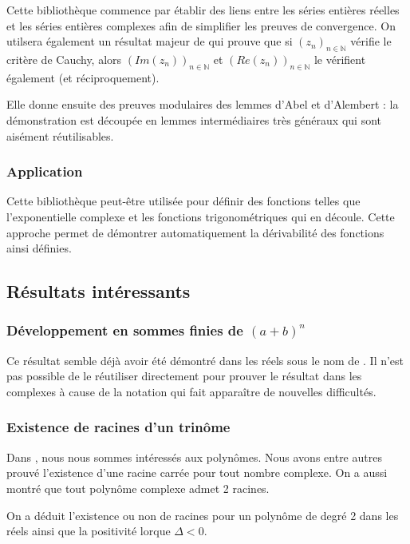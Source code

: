 Cette bibliothèque commence par établir des liens entre les séries entières réelles et les séries entières complexes afin de simplifier les preuves de convergence. On utilsera également un résultat majeur de  qui prouve que si $(z_n)_{n \in \mathbb{N}}$ vérifie le critère de Cauchy, alors $(Im (z_n))_{n \in \mathbb{N}}$ et $(Re(z_n))_{n \in \mathbb{N}}$ le vérifient également (et réciproquement).

Elle donne ensuite des preuves modulaires des lemmes d'Abel et d'Alembert : la démonstration est découpée en lemmes intermédiaires très généraux qui sont aisément réutilisables.

\subsubsection{Application}

Cette bibliothèque peut-être utilisée pour définir des fonctions telles que l'exponentielle complexe et les fonctions trigonométriques qui en découle. Cette approche permet de démontrer automatiquement la dérivabilité des fonctions ainsi définies.

\subsection{Résultats intéressants}

\subsubsection{D\'eveloppement en sommes finies de $(a + b) ^ n$}

Ce résultat semble déjà avoir été démontré dans les réels sous le nom de . Il n'est pas possible de le réutiliser directement pour prouver le résultat dans les complexes à cause de la notation  qui fait apparaître de nouvelles difficultés.

\subsubsection{Existence de racines d'un trinôme}

Dans , nous nous sommes intéressés aux polynômes. Nous avons entre autres prouvé l'existence d'une racine carrée pour tout nombre complexe. On a aussi montré que tout polynôme complexe admet 2 racines.

On a déduit l'existence ou non de racines pour un polynôme de degré 2 dans les réels ainsi que la positivité lorque $\Delta < 0$.

